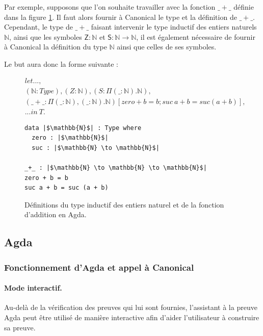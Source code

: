 \documentclass[11pt]{article}
\begin{document}
Par exemple, supposons que l’on souhaite travailler avec la fonction $\mathsf{\_+\_}$ définie dans la figure \ref{fig:agda-nat}. 
Il faut alors fournir à Canonical le type et la définition de $\mathsf{\_+\_}$. 
Cependant, le type de $\mathsf{\_+\_}$ faisant intervenir le type inductif des entiers naturels $\mathsf{\mathbb{N}}$, 
ainsi que les symboles $\mathsf{Z : \mathbb{N}}$ et $\mathsf{S : \mathbb{N} \to \mathbb{N}}$, 
il est également nécessaire de fournir à Canonical la définition du type $\mathsf{\mathbb{N}}$ ainsi que celles de ses symboles.

Le but aura donc la forme suivante :


\begin{align*}
&let ..., \\
&(\mathbb{N} : Type), (Z : \mathbb{N}), (S : \Pi (\_ : \mathbb{N}).\mathbb{N}),\\
&(\_+\_ : \Pi (\_ : \mathbb{N}), (\_ : \mathbb{N}).\mathbb{N}) [zero + b = b ; suc~a + b = suc (a + b)],\\ 
&... in~T.
\end{align*}

\begin{figure}[htbp]
\centering
\begin{verbatim}
data |$\mathbb{N}$| : Type where
  zero : |$\mathbb{N}$|
  suc : |$\mathbb{N} \to \mathbb{N}$|
  
_+_ : |$\mathbb{N} \to \mathbb{N} \to \mathbb{N}$|
zero + b = b
suc a + b = suc (a + b) 
\end{verbatim}
\caption{Définitions du type inductif des entiers naturel et de la fonction d'addition en Agda. }
\label{fig:agda-nat}
\end{figure}



\subsection{Agda}
\subsubsection{Fonctionnement d'Agda et appel à Canonical}
\paragraph{Mode interactif.}
Au-delà de la vérification des preuves qui lui sont fournies, 
l’assistant à la preuve Agda peut être utilisé de manière interactive afin d’aider l’utilisateur à construire sa preuve.
\end{document}
